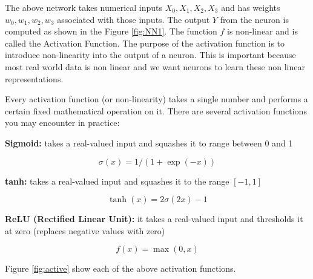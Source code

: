 \documentclass[]{book}
\begin{document}
The above network takes numerical inputs \(X_0,X_1,X_2, X_3\) and has
weights \(w_0,w_1,w_2,w_3\) associated with those inputs. The output
\(Y\) from the neuron is computed as shown in the Figure \ref{fig:NN1}.
The function \(f\) is non-linear and is called the Activation Function.
The purpose of the activation function is to introduce non-linearity
into the output of a neuron. This is important because most real world
data is non linear and we want neurons to learn these non linear
representations.

Every activation function (or non-linearity) takes a single number and
performs a certain fixed mathematical operation on it. There are several
activation functions you may encounter in practice:

\textbf{Sigmoid:} takes a real-valued input and squashes it to range
between 0 and 1

\[
  \sigma(x) = 1 / (1 + \exp(-x))
\]

\textbf{tanh:} takes a real-valued input and squashes it to the range
\([-1, 1]\)

\[
  \tanh(x) = 2\sigma(2x) - 1
\]

\textbf{ReLU (Rectified Linear Unit):} it takes a real-valued input and
thresholds it at zero (replaces negative values with zero)

\[
  f(x) = \max(0, x)
\]

Figure \ref{fig:active} show each of the above activation functions.
\end{document}
